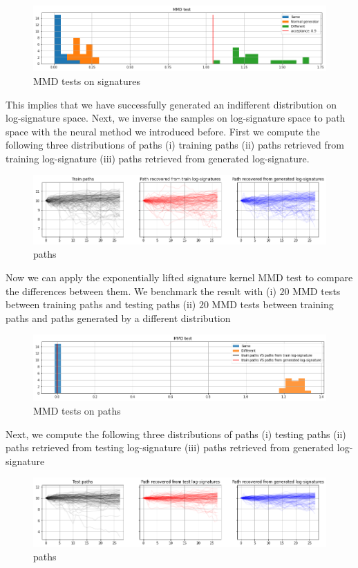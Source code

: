 \documentclass[12pt]{report}
\theoremstyle{definition}
\theoremstyle{remark}
\begin{document}
 \begin{figure}[H]
    \centering
    \includegraphics[width=\textwidth]{figs/cvae10.png}
    \caption{MMD tests on signatures}
\end{figure}
This implies that we have successfully generated an indifferent distribution on log-signature space. Next, we inverse the samples on log-signature space to path space with the neural method we introduced before. First we compute the following three distributions of paths (i) training paths (ii) paths retrieved from training log-signature (iii) paths retrieved from generated log-signature.
 \begin{figure}[H]
    \centering
    \includegraphics[width=\textwidth]{figs/cvae11.png}
    \caption{paths}
\end{figure}
Now we can apply the exponentially lifted signature kernel MMD test to compare the differences between them. We benchmark the result with (i) $20$ MMD tests between training paths and testing paths (ii) $20$ MMD tests between training paths and paths generated by a different distribution
 \begin{figure}[H]
    \centering
    \includegraphics[width=\textwidth]{figs/cvae12.png}
    \caption{MMD tests on paths}
\end{figure}
Next, we compute the following three distributions of paths (i) testing paths (ii) paths retrieved from testing log-signature (iii) paths retrieved from generated log-signature
 \begin{figure}[H]
    \centering
    \includegraphics[width=\textwidth]{figs/cvae13.png}
    \caption{paths}
\end{figure}
\end{document}
